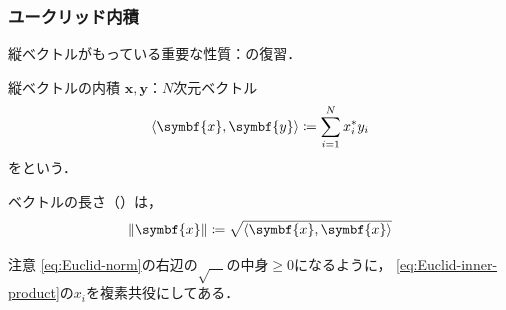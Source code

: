 \documentclass[
    10pt,
    ]{sotsu-beamer}
\begin{document}
\begin{frame}
    \frametitle{ユークリッド内積}

    縦ベクトルがもっている重要な性質：の復習．

    \pause 

    \begin{block}{縦ベクトルの内積}
        $\symbf{x}, \symbf{y}$：$N$次元ベクトル
        \begin{equation}
            \label{eq:Euclid-inner-product}
            \iparen{\symbf{x}, \symbf{y}}
                \coloneq \sum_{i=1}^{N} x_i^* y_i
        \end{equation}
        をという．
    \end{block}

    ベクトルの長さ（）は，
    \begin{equation}
        \label{eq:Euclid-norm}
        \norm{\symbf{x}} \coloneq \sqrt{\iparen{\symbf{x}, \symbf{x}}}
    \end{equation}

    \begin{alertblock}{注意}
        \eqref{eq:Euclid-norm}の右辺の$\sqrt{\quad}$の中身$\geq 0$になるように，
        \eqref{eq:Euclid-inner-product}の$x_i$を複素共役にしてある．
    \end{alertblock}

\end{frame}
\end{document}

